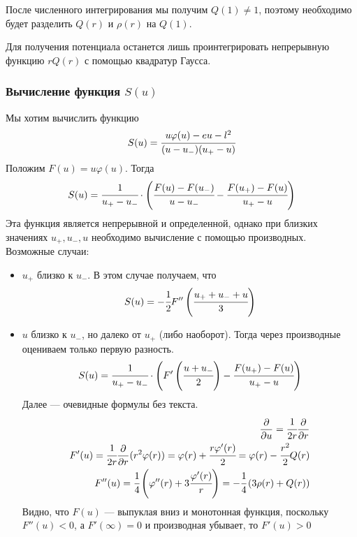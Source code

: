 	После численного интегрирования мы получим $Q(1) \ne 1$, поэтому необходимо будет разделить $Q(r)$ и $\rho(r)$ на $Q(1)$.
	
	Для получения потенциала останется лишь проинтегрировать непрерывную функцию $rQ(r)$ с помощью квадратур Гаусса.
	
	\subsubsection{Вычисление функция $S(u)$}
	Мы хотим вычислить функцию 
	\begin{equation}
		S(u) = \cfrac{u\varphi(u) -eu-l^2}{(u-u_{-})(u_{+}-u)}
	\end{equation}
	Положим $F(u) = u\varphi(u)$.
	Тогда 
	\begin{equation}
		S(u) = \cfrac{1}{u_{+}-u_{-}}\cdot 
		\left(\cfrac{F(u)-F(u_{-})}{u-u_{-}} - \cfrac{F(u_{+})-F(u)}{u_{+}-u}\right)
	\end{equation}
	Эта функция является непрерывной и определенной, однако при близких значениях $u_{+}, u_{-}, u$ необходимо вычисление с помощью производных.
	Возможные случаи:
	\begin{itemize}
		\item $u_{+}$ близко к $u_{-}$. В этом случае получаем, что 
		\begin{equation}
			S(u) = -\cfrac{1}{2}F''\left(\cfrac{u_{+} + u_{-} + u}{3}\right)
		\end{equation}
		
		\item $u$ близко к $u_{-}$, но далеко от $u_{+}$ (либо наоборот). Тогда через производные оцениваем только первую разность.
		\begin{equation}
			S(u) = \cfrac{1}{u_{+}-u_{-}}\cdot 
			\left(F'\left(\cfrac{u+u_{-}}{2}\right) - \cfrac{F(u_{+})-F(u)}{u_{+}-u}\right)
		\end{equation}
		Далее --- очевидные формулы без текста.
		\begin{eqnarray}
			\frac{\partial }{\partial u} = \cfrac{1}{2r}\frac{\partial }{\partial r}\\
			F'(u) = \cfrac{1}{2r}\frac{\partial }{\partial r}(r^2\varphi(r)) = 
			\varphi(r) + \cfrac{r\varphi'(r)}{2} = \varphi(r) -\cfrac{r^2}{2} Q(r) \\
			F''(u) = \cfrac{1}{4}
			\left( \varphi''(r) + 3\cfrac{\varphi'(r)}{r}\right) = -\cfrac{1}{4}\left(3\rho(r) + Q(r)\right)
		\end{eqnarray}
		Видно, что $F(u)$ --- выпуклая вниз и монотонная функция, поскольку $F''(u) < 0$, а $F'(\infty) = 0$ и производная убывает, то $F'(u) > 0$
		
	\end{itemize}
	
